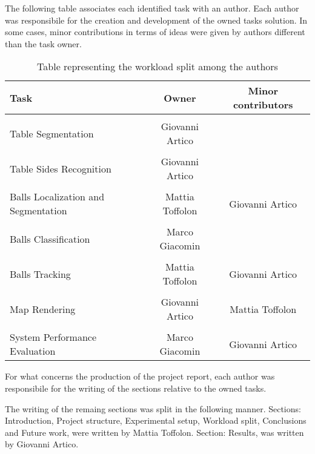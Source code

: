 The following table associates each identified task with an author. Each author was responsibile for the creation and development of the owned tasks solution.
In some cases, minor contributions in terms of ideas were given by authors different than the task owner.
\begin{table}[h]
\centering
\begin{tabular}{|l|c|c|}
    \hline
    \textbf{Task} & \textbf{Owner} & \textbf{Minor contributors}  \\ \hline
    \\[-1em]
    Table Segmentation  & Giovanni Artico & \\ \hline
    \\[-1em]
    Table Sides Recognition &  Giovanni Artico & \\ \hline
    \\[-1em]
    Balls Localization and Segmentation & Mattia Toffolon & Giovanni Artico\\ \hline
    \\[-1em]
    Balls Classification & Marco Giacomin & \\ \hline
    \\[-1em]
    Balls Tracking & Mattia Toffolon & Giovanni Artico\\ \hline
    \\[-1em]
    Map Rendering & Giovanni Artico & Mattia Toffolon \\ \hline
    \\[-1em]
    System Performance Evaluation & Marco Giacomin & Giovanni Artico \\ \hline
\end{tabular}
\caption{Table representing the workload split among the authors}
\end{table}

\begin{flushleft}
For what concerns the production of the project report, each author was responsibile for the writing of the sections relative to the owned tasks. \\   
\end{flushleft}
The writing of the remaing sections was split in the following manner.
Sections: Introduction, Project structure, Experimental setup, Workload split, Conclusions and Future work, were written by Mattia Toffolon. 
Section: Results, was written by Giovanni Artico. \\

